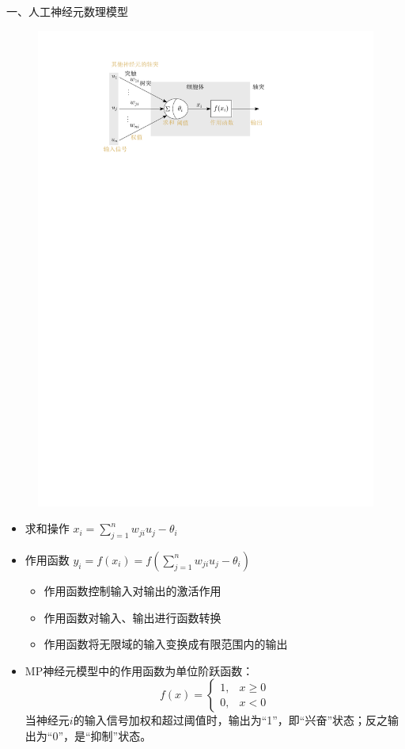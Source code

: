 \textcolor{main1}{一、人工神经元数理模型}
\begin{figure}[htbp]
    \centering
    \includegraphics{image/MP神经元模型.pdf}
\end{figure}
\begin{itemize}
    \item 求和操作 $x_i = \sum\limits_{j = 1}^{n}w_{ji}u_{j}-\theta_{i}$
    \item 作用函数 $y_i = f(x_i) = f\left( \sum\limits_{j = 1}^{n}w_{ji}u_{j}-\theta_{i} \right)$
    \begin{itemize}
        \item 作用函数控制输入对输出的激活作用
        \item 作用函数对输入、输出进行函数转换
        \item 作用函数将无限域的输入变换成有限范围内的输出
    \end{itemize}
    \item MP神经元模型中的作用函数为单位阶跃函数：
    \[
        f(x) = \left\{
            \begin{array}{ll}
                1, & x\geq 0\\
                0, & x<0
            \end{array}
        \right.
    \]
    当神经元$i $的输入信号加权和超过阈值时，输出为“1”，即“兴奋”状态；反之输出为“0”，是“抑制”状态。
\end{itemize}
